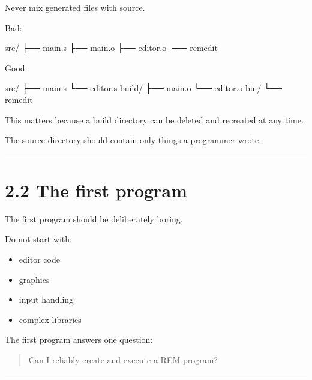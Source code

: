 \documentclass[
  oneside,
  openany]{book}
\newenvironment{Shaded}{\begin{snugshade}}{\end{snugshade}}
\newcommand{\NormalTok}[1]{#1}
\providecommand{\tightlist}{%
  \setlength{\itemsep}{0pt}\setlength{\parskip}{0pt}}
\begin{document}
Never mix generated files with source.

Bad:

\begin{Shaded}
\begin{Highlighting}[]
\NormalTok{src/}
\NormalTok{├── main.s}
\NormalTok{├── main.o}
\NormalTok{├── editor.o}
\NormalTok{└── remedit}
\end{Highlighting}
\end{Shaded}

Good:

\begin{Shaded}
\begin{Highlighting}[]
\NormalTok{src/}
\NormalTok{├── main.s}
\NormalTok{└── editor.s}
\NormalTok{build/}
\NormalTok{├── main.o}
\NormalTok{└── editor.o}
\NormalTok{bin/}
\NormalTok{└── remedit}
\end{Highlighting}
\end{Shaded}

This matters because a build directory can be deleted and recreated at
any time.

The source directory should contain only things a programmer wrote.

\begin{center}\rule{0.5\linewidth}{0.5pt}\end{center}

\hypertarget{the-first-program}{%
\section{2.2 The first program}\label{the-first-program}}

The first program should be deliberately boring.

Do not start with:

\begin{itemize}
\tightlist
\item
  editor code
\item
  graphics
\item
  input handling
\item
  complex libraries
\end{itemize}

The first program answers one question:

\begin{quote}
Can I reliably create and execute a REM program?
\end{quote}

\begin{center}\rule{0.5\linewidth}{0.5pt}\end{center}
\end{document}
